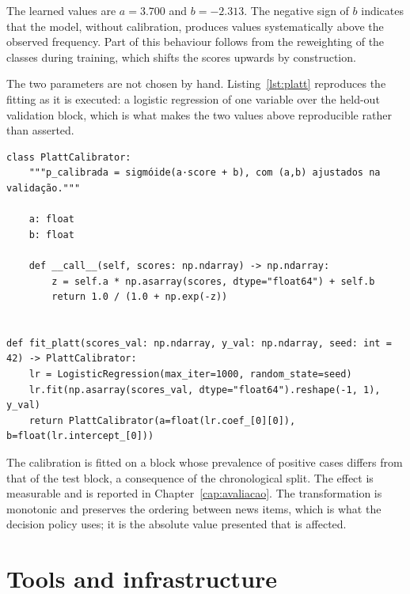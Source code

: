 The learned values are $a = 3.700$ and $b = -2.313$. The negative sign of $b$ indicates that the
model, without calibration, produces values systematically above the observed frequency. Part of
this behaviour follows from the reweighting of the classes during training, which shifts the scores
upwards by construction.

The two parameters are not chosen by hand. Listing~\ref{lst:platt} reproduces the fitting as it is executed: a logistic regression of one variable over the held-out validation block, which is what makes the two values above reproducible rather than asserted.

\begin{lstlisting}[caption={[Where a score becomes a probability]Where a score becomes a probability. The two parameters are not chosen: they are fitted by a logistic regression over the held-out validation block, which is what makes the value in Equation~\ref{eq:platt} reproducible. The class and the fitting function are reproduced from the source file; the comment and the identifiers are in the original.}, label={lst:platt}, float=htbp]
class PlattCalibrator:
    """p_calibrada = sigmóide(a·score + b), com (a,b) ajustados na validação."""

    a: float
    b: float

    def __call__(self, scores: np.ndarray) -> np.ndarray:
        z = self.a * np.asarray(scores, dtype="float64") + self.b
        return 1.0 / (1.0 + np.exp(-z))


def fit_platt(scores_val: np.ndarray, y_val: np.ndarray, seed: int = 42) -> PlattCalibrator:
    lr = LogisticRegression(max_iter=1000, random_state=seed)
    lr.fit(np.asarray(scores_val, dtype="float64").reshape(-1, 1), y_val)
    return PlattCalibrator(a=float(lr.coef_[0][0]), b=float(lr.intercept_[0]))
\end{lstlisting}

The calibration is fitted on a block whose prevalence of positive cases differs from that of the
test block, a consequence of the chronological split. The effect is measurable and is reported in
Chapter~\ref{cap:avaliacao}. The transformation is monotonic and preserves the ordering between
news items, which is what the decision policy uses; it is the absolute value presented that is
affected.

\section{Tools and infrastructure}
\label{sec:met_ferramentas}

